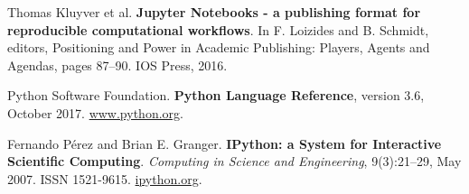 \documentclass[runningheads]{llncs}
\begin{document}
%
%
% 
% 
%
\begin{thebibliography}{8}
Thomas Kluyver et al.
\textbf{Jupyter Notebooks - a publishing format for reproducible computational workflows}.
In F. Loizides and B. Schmidt, editors, Positioning and Power in Academic Publishing: Players, Agents and Agendas, pages 87–90. IOS Press, 2016.

Python Software Foundation.
\textbf{Python Language Reference}, version 3.6, October 2017. \url{www.python.org}.

Fernando Pérez and Brian E. Granger.
\textbf{IPython: a System for Interactive Scientific Computing}.
\emph{Computing in Science and Engineering}, 9(3):21–29, May 2007. ISSN 1521-9615. \url{ipython.org}.
\end{thebibliography}
\end{document}
